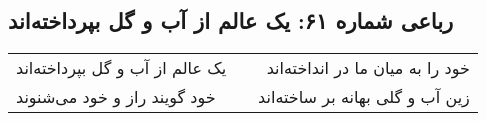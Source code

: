 \begin{center}
\section*{رباعی شماره ۶۱: یک عالم از آب و گل بپرداخته‌اند}
\label{sec:061}
\begin{longtable}{l p{0.5cm} r}
یک عالم از آب و گل بپرداخته‌اند
&&
خود را به میان ما در انداخته‌اند
\\
خود گویند راز و خود می‌شنوند
&&
زین آب و گلی بهانه بر ساخته‌اند
\\
\end{longtable}
\end{center}
